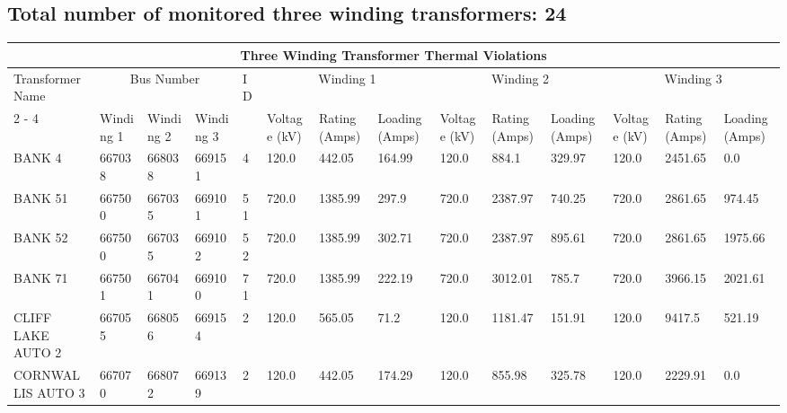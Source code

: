 \documentclass{article}%
\begin{document}
\subsection*{Total number of monitored three winding transformers: 24}%
\label{subsec:Totalnumberofmonitoredthreewindingtransformers24}%
\begin{tabularx}{\textwidth}{| p{1.7cm} | X | X | X |p{0.3cm} | X | X | X | X | X | X | X | X | X |}%
\hline%
\multicolumn{14}{|c|}{Three Winding Transformer Thermal Violations}\\%
\hline%
Transformer Name&\multicolumn{3}{|c|}{Bus Number}&ID&\multicolumn{3}{|c|}{Winding 1}&\multicolumn{3}{|c|}{Winding 2}&\multicolumn{3}{|c|}{Winding 3}\\%
\cline{2%
-%
4}%
\cline{5%
-%
7}%
\cline{8%
-%
10}%
&Winding 1&Winding 2&Winding 3&&Voltage (kV)&Rating (Amps)&Loading (Amps)&Voltage (kV)&Rating (Amps)&Loading (Amps)&Voltage (kV)&Rating (Amps)&Loading (Amps)\\%
\hline%
BANK 4&667038&668038&669151&4&120.0&442.05&164.99&120.0&884.1&329.97&120.0&2451.65&0.0\\%
\hline%
\hline%
BANK 51&667500&667035&669101&51&720.0&1385.99&297.9&720.0&2387.97&740.25&720.0&2861.65&974.45\\%
\hline%
\hline%
BANK 52&667500&667035&669102&52&720.0&1385.99&302.71&720.0&2387.97&895.61&720.0&2861.65&1975.66\\%
\hline%
\hline%
BANK 71&667501&667041&669100&71&720.0&1385.99&222.19&720.0&3012.01&785.7&720.0&3966.15&2021.61\\%
\hline%
\hline%
CLIFF LAKE AUTO 2&667055&668056&669154&2&120.0&565.05&71.2&120.0&1181.47&151.91&120.0&9417.5&521.19\\%
\hline%
\hline%
CORNWALLIS AUTO 3&667070&668072&669139&2&120.0&442.05&174.29&120.0&855.98&325.78&120.0&2229.91&0.0\\%
\hline%
\end{tabularx}

%
\end{document}
